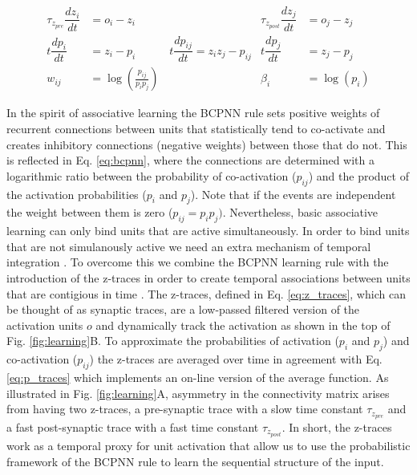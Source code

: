 \documentclass[10pt,a4paper]{article}
\begin{document}
\begin{align}
\tau_{z_{pre}} \dfrac{dz_i}{dt} &= o_i - z_i 
& \tau_{z_{post}} \dfrac{d z_j}{dt} &= o_j - z_j \label{eq:z_traces} \\
t \dfrac{dp_i}{dt} &= z_i - p_i  
\qquad \quad t\dfrac{dp_{ij}}{dt} = z_i z_j - p_{ij}
&t\dfrac{dp_j}{dt} &= z_j - p_j    \label{eq:p_traces} \\
w_{ij} &= \log \left(\frac{p_{ij}}{p_i p_j} \right) & \beta_i &= \log(p_i) \label{eq:bcpnn} 
\end{align}

In the spirit of associative learning the BCPNN rule sets positive weights of recurrent connections between units that statistically tend to co-activate and creates inhibitory connections (negative weights) between those that do not. This is reflected in Eq. \ref{eq:bcpnn}, where the connections are determined with a logarithmic ratio between the probability of co-activation ($p_{ij}$) and the product of the activation probabilities ($p_i$ and $p_j$). Note that if the events are independent the weight between them is zero ($p_{ij}=p_i p_j)$. Nevertheless, basic associative learning can only bind units that are active simultaneously. In order to bind units that are not simulanously active we need an extra mechanism of temporal integration \cite{amit1992modeling}. To overcome this we combine the BCPNN learning rule with the introduction of the z-traces in order to create temporal associations between units that are contigious in time \cite{tully2016spike}. The z-traces, defined in Eq. \ref{eq:z_traces}, which can be thought of as synaptic traces, are a low-passed filtered version of the activation units $o$ and dynamically track the activation as shown in the top of Fig. \ref{fig:learning}B. To approximate the probabilities of activation ($p_i$ and $p_j$) and co-activation ($p_{ij}$) the z-traces are averaged over time in agreement with Eq. \ref{eq:p_traces} which implements an on-line version of the average function. As illustrated in Fig. \ref{fig:learning}A, asymmetry in the connectivity matrix arises from having two z-traces, a pre-synaptic trace with a slow time constant $\tau_{z_{pre}}$ and a fast post-synaptic trace with a fast time constant $\tau_{z_{post}}$. In short, the z-traces work as a temporal proxy for unit activation that allow us to use the probabilistic framework of the BCPNN rule to learn the sequential structure of the input.


 
\end{document}
